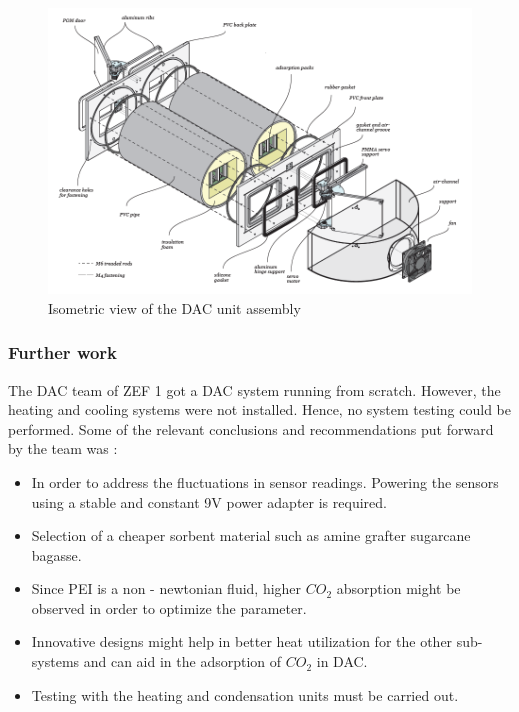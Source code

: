 \begin{figure}[H]
    \centering
    \includegraphics[width=\linewidth]{images/previouswork/zef1ass.png}
    \caption{Isometric view of the DAC unit assembly \cite{Azzalini2018}}
    \label{fig:zef1ass}
\end{figure}

\subsubsection{Further work}
The DAC team of ZEF 1 got a DAC system running from scratch. However, the heating and cooling systems were not installed. Hence, no system testing could be performed. Some of the relevant conclusions and recommendations put forward by the team was :

\begin{itemize}
    \item In order to address the fluctuations in sensor readings. Powering the sensors using a stable and constant 9V power adapter is required. 
    \item Selection of a cheaper sorbent material such as amine grafter sugarcane bagasse. 
    \item Since PEI is a non - newtonian fluid, higher $CO_2$ absorption might be observed in order to optimize the parameter. 
    \item Innovative designs might help in better heat utilization for the other sub-systems and can aid in the adsorption of $CO_2$ in DAC. 
    \item Testing with the heating and condensation units must be carried out. 
\end{itemize}

